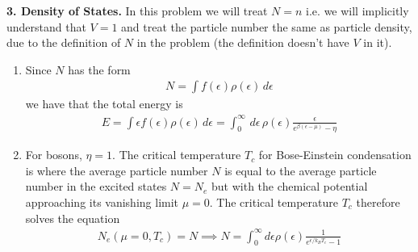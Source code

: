 \documentclass{article}
\theoremstyle{definition}
\newcommand{\be}{\beta}
\newcommand{\f}[2]{\frac{#1}{#2}}
\begin{document}
\noindent \textbf{3. Density of States.} In this problem we will treat $N=n$ i.e. we will implicitly understand that $V=1$ and treat the particle number the same as particle density, due to the definition of $N$ in the problem (the definition doesn't have $V$ in it).

\begin{enumerate}[label=(\alph*)]
	\item Since $N$ has the form
	\begin{align*}
	N = \int f(\epsilon)\rho(\epsilon)\,d\epsilon
	\end{align*}
	we have that the total energy is 
	\begin{align*}
	E = \int \epsilon f(\epsilon) \rho(\epsilon) \,d\epsilon = \boxed{\int_0^\infty \,d\epsilon\, \rho(\epsilon) \f{\epsilon}{e^{\be(\epsilon-\mu) }- \eta}}
	\end{align*}
	
	\item For bosons, $\eta = 1$. The critical temperature $T_c$ for Bose-Einstein condensation is where the average particle number $N$ is equal to the average particle number in the excited states $N = N_e$ but with the chemical potential approaching its vanishing limit $\mu=0$. The critical temperature $T_c$ therefore solves the equation
	\begin{align*}
	N_e(\mu=0, T_c) = N \implies \boxed{N = \int_0^\infty d\epsilon \rho(\epsilon) \f{1}{e^{\epsilon/k_BT_c} - 1 }}
	\end{align*}
	

\end{enumerate}
\end{document}
